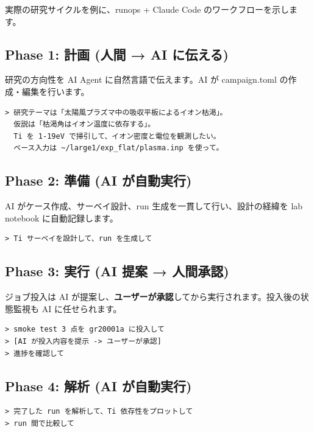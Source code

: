\documentclass[a4paper,11pt]{article}
\begin{document}
実際の研究サイクルを例に、runops + Claude Code のワークフローを示します。

\subsection*{\color{accent} Phase 1: 計画 (人間 → AI に伝える)}

研究の方向性を AI Agent に自然言語で伝えます。AI が campaign.toml の作成・編集を行います。

\begin{lstlisting}[language={},commentstyle={}]
> 研究テーマは「太陽風プラズマ中の吸収平板によるイオン枯渇」。
  仮説は「枯渇角はイオン温度に依存する」。
  Ti を 1-19eV で掃引して、イオン密度と電位を観測したい。
  ベース入力は ~/large1/exp_flat/plasma.inp を使って。
\end{lstlisting}

\subsection*{\color{accent} Phase 2: 準備 (AI が自動実行)}

AI がケース作成、サーベイ設計、run 生成を一貫して行い、設計の経緯を lab notebook に自動記録します。

\begin{lstlisting}[language={},commentstyle={}]
> Ti サーベイを設計して、run を生成して
\end{lstlisting}

\subsection*{\color{accent} Phase 3: 実行 (AI 提案 → 人間承認)}

ジョブ投入は AI が提案し、\textbf{ユーザーが承認}してから実行されます。投入後の状態監視も AI に任せられます。

\begin{lstlisting}[language={},commentstyle={}]
> smoke test 3 点を gr20001a に投入して
> [AI が投入内容を提示 -> ユーザーが承認]
> 進捗を確認して
\end{lstlisting}

\subsection*{\color{accent} Phase 4: 解析 (AI が自動実行)}

\begin{lstlisting}[language={},commentstyle={}]
> 完了した run を解析して、Ti 依存性をプロットして
> run 間で比較して
\end{lstlisting}
\end{document}
